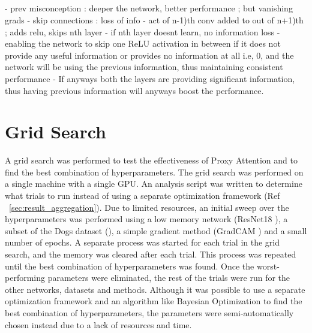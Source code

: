 \subsection{}
- prev misconception : deeper the network, better performance ; but vanishing grads
- skip connections : loss of info
- act of n-1)th conv added to out of n+1)th ; adds relu, skips nth layer
- if nth layer doesnt learn, no information loss
- enabling the network to skip one ReLU activation in between if it does not provide any useful information or provides no information at all i.e, 0, and the network will be using the previous information, thus maintaining consistent performance
- If anyways both the layers are providing significant information, thus having previous information will anyways boost the performance.

\subsection{}
\subsection{}
\subsection{}

\section{Grid Search}
A grid search was performed to test the effectiveness of Proxy Attention and to find the best combination of hyperparameters. The grid search was performed on a single machine with a single GPU. An analysis script was written to determine what trials to run instead of using a separate optimization framework (Ref ~\ref{sec:result_aggregation}).
Due to limited resources, an initial sweep over the hyperparameters was performed using a low memory network (ResNet18 \cite{heDeepResidualLearning2016}), a subset of the Dogs dataset (\cite{khoslaNovelDatasetFineGrained}), a simple gradient method (GradCAM \cite{selvarajuGradCAMVisualExplanations}) and a small number of epochs. A separate process was started for each trial in the grid search, and the memory was cleared after each trial. This process was repeated until the best combination of hyperparameters was found. Once the worst-performing parameters were eliminated, the rest of the trials were run for the other networks, datasets and methods.
Although it was possible to use a separate optimization framework and an algorithm like Bayesian Optimization to find the best combination of hyperparameters, the parameters were semi-automatically chosen instead due to a lack of resources and time.

